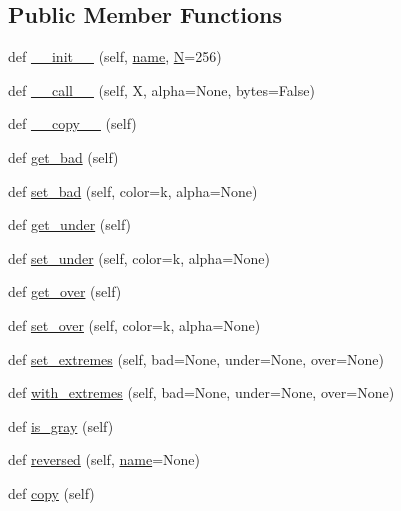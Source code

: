 \subsection*{Public Member Functions}
\begin{DoxyCompactItemize}
\item 
def \hyperlink{classmatplotlib_1_1colors_1_1Colormap_a7e05ab14cde241da5bfcacaed387ec5e}{\+\_\+\+\_\+init\+\_\+\+\_\+} (self, \hyperlink{classmatplotlib_1_1colors_1_1Colormap_aa816ba9aebc8d8438ca791c82bb6198c}{name}, \hyperlink{classmatplotlib_1_1colors_1_1Colormap_a011f75e2d28856dd18ada18febb2bb26}{N}=256)
\item 
def \hyperlink{classmatplotlib_1_1colors_1_1Colormap_a6f531c90c97169b34de276c1380b395b}{\+\_\+\+\_\+call\+\_\+\+\_\+} (self, X, alpha=None, bytes=False)
\item 
def \hyperlink{classmatplotlib_1_1colors_1_1Colormap_af0caf818eeb96729b83ec398b4009eec}{\+\_\+\+\_\+copy\+\_\+\+\_\+} (self)
\item 
def \hyperlink{classmatplotlib_1_1colors_1_1Colormap_aeb405af1b60cacd32230d4e3c2491ee4}{get\+\_\+bad} (self)
\item 
def \hyperlink{classmatplotlib_1_1colors_1_1Colormap_adef213282b895fa8918f6301adab8788}{set\+\_\+bad} (self, color=\textquotesingle{}k\textquotesingle{}, alpha=None)
\item 
def \hyperlink{classmatplotlib_1_1colors_1_1Colormap_ae5287c447944154b2061ace2c82402b2}{get\+\_\+under} (self)
\item 
def \hyperlink{classmatplotlib_1_1colors_1_1Colormap_ac1c99fa9d2a3b5ac1000b3f76ed03599}{set\+\_\+under} (self, color=\textquotesingle{}k\textquotesingle{}, alpha=None)
\item 
def \hyperlink{classmatplotlib_1_1colors_1_1Colormap_af71907975bd3cfc394aea0aa2555a939}{get\+\_\+over} (self)
\item 
def \hyperlink{classmatplotlib_1_1colors_1_1Colormap_aa232a6b3a533fa42f35b32bcf533ea2b}{set\+\_\+over} (self, color=\textquotesingle{}k\textquotesingle{}, alpha=None)
\item 
def \hyperlink{classmatplotlib_1_1colors_1_1Colormap_a9038b3b8d92f01f8d33e3a053a60f606}{set\+\_\+extremes} (self, bad=None, under=None, over=None)
\item 
def \hyperlink{classmatplotlib_1_1colors_1_1Colormap_a57afd28dbb0631d58b662c7a53858e21}{with\+\_\+extremes} (self, bad=None, under=None, over=None)
\item 
def \hyperlink{classmatplotlib_1_1colors_1_1Colormap_a16c7de119067241c6ff90ae4f1f88aa3}{is\+\_\+gray} (self)
\item 
def \hyperlink{classmatplotlib_1_1colors_1_1Colormap_a4d568231f3fa026884c1cf80cf984dc2}{reversed} (self, \hyperlink{classmatplotlib_1_1colors_1_1Colormap_aa816ba9aebc8d8438ca791c82bb6198c}{name}=None)
\item 
def \hyperlink{classmatplotlib_1_1colors_1_1Colormap_a85c6fe3de1c3585299ac312b8acdaccc}{copy} (self)
\end{DoxyCompactItemize}
